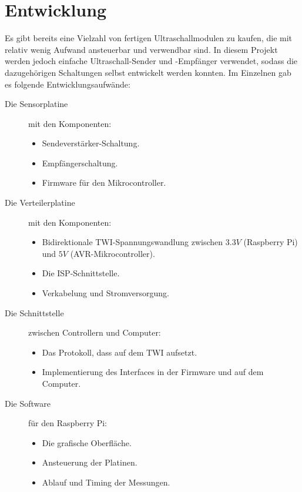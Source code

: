 \section{Entwicklung}
Es gibt bereits eine Vielzahl von fertigen Ultraschallmodulen zu kaufen, die mit relativ wenig Aufwand ansteuerbar und verwendbar sind. In diesem Projekt werden jedoch einfache Ultraschall-Sender und -Empfänger verwendet, sodass die dazugehörigen Schaltungen selbst entwickelt werden konnten. Im Einzelnen gab es folgende Entwicklungsaufwände:
\begin{description}
	\item[Die Sensorplatine] mit den Komponenten:
	\begin{itemize}
		\item Sendeverstärker-Schaltung.
		\item Empfängerschaltung.
		\item Firmware für den Mikrocontroller.
	\end{itemize}
	\item[Die Verteilerplatine] mit den Komponenten:
	\begin{itemize}
		\item Bidirektionale \ac{TWI}-Spannungswandlung zwischen $3.3V$ (Raspberry Pi) und $5V$ (AVR-Mikrocontroller).
		\item Die \ac{ISP}-Schnittstelle.
		\item Verkabelung und Stromversorgung.
	\end{itemize}
	\item[Die Schnittstelle] zwischen Controllern und Computer:
	\begin{itemize}
		\item Das Protokoll, dass auf dem \ac{TWI} aufsetzt.
		\item Implementierung des Interfaces in der Firmware und auf dem Computer.
	\end{itemize}
	\item[Die Software] für den Raspberry Pi:
	\begin{itemize}
		\item Die grafische Oberfläche.
		\item Ansteuerung der Platinen.
		\item Ablauf und Timing der Messungen.
	\end{itemize}
\end{description}



